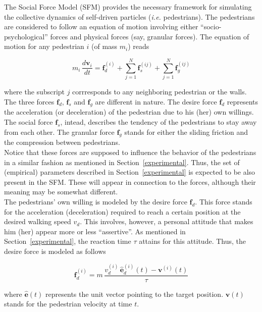 \documentclass[preprint,12pt]{elsarticle}
\begin{document}
The Social Force Model (SFM) provides the necessary framework for simulating 
the collective dynamics of self-driven particles (\textit{i.e.} pedestrians). 
The pedestrians are considered to follow an equation of motion involving 
either ``socio-psychological'' forces and physical forces (say, granular 
forces). The equation of motion for any pedestrian $i$ (of mass $m_i$) reads

\begin{equation}
 m_i\,\displaystyle\frac{d\mathbf{v}_i}{dt}=\mathbf{f}_d^{(i)}+
 \displaystyle\sum_{j=1}^N\mathbf{f}_s^{(ij)}+
 \displaystyle\sum_{j=1}^N\mathbf{f}_g^{(ij)}\label{eqn_motion}
\end{equation}

\noindent where the subscript $j$ corrresponds to any neighboring pedestrian or 
the walls. The three forces $\mathbf{f}_d$, $\mathbf{f}_s$ and $\mathbf{f}_g$ 
are different in nature. The desire force $\mathbf{f}_d$ represents the 
acceleration (or deceleration) of the pedestrian due to his (her) own willings. 
The social force $\mathbf{f}_s$, intead, describes the tendency of the 
pedestrians to stay away from each other. The granular force $\mathbf{f}_g$ 
stands for either the sliding friction and the compression between 
pedestrians. \\

Notice that these forces are supposed to influence the behavior of the 
pedestrians in a similar fashion as mentioned in Section~\ref{experimental}. 
Thus, the set of (empirical) parameters described in Section~\ref{experimental} 
is expected to be also present in the SFM. These will appear in connection to 
the forces, although their meaning may be somewhat different. \\   

The pedestrians' own willing is modeled by the desire force $\mathbf{f}_d$. 
This force stands for the acceleration (deceleration) required to reach a 
certain position at the desired walking speed $v_d$. This involves, however, a 
personal attitude that makes him (her) appear more or less ``assertive''. As 
mentioned in Section~\ref{experimental}, the reaction time $\tau$  attains for 
this attitude. Thus, the desire force is modeled as follows

\begin{equation}
\mathbf{f}_d^{(i)}=m\,\displaystyle\frac{v_d^{(i)}\,
\hat{\mathbf{e}}_d^{(i)}(t)-
 \mathbf{v}^{(i)}(t)}{\tau}
\end{equation}


\noindent where $\hat{\mathbf{e}}(t)$ represents the unit vector pointing to 
the target position. $\mathbf{v}(t)$ stands for the pedestrian velocity at time 
$t$. \\
\end{document}

